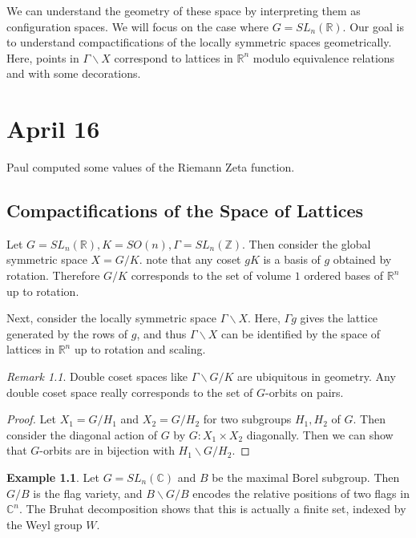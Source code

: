 \documentclass[leqno, openany]{memoir}
\theoremstyle{definition}
\newtheorem{exm}[thm]{Example}
\theoremstyle{remark}
\newtheorem{rmk}[thm]{Remark}
\theoremstyle{plain}
\theoremstyle{definition}
\theoremstyle{remark}
\newcommand{\R}{\mathbb{R}}
\newcommand{\C}{\mathbb{C}}
\newcommand{\Z}{\mathbb{Z}}
\begin{document}
We can understand the geometry of these space by interpreting them as
configuration spaces. We will focus on the case where $G = SL_n(\R)$. Our goal
is to understand compactifications of the locally symmetric spaces
geometrically. Here, points in $\Gamma \backslash X$ correspond to lattices in
$\R^n$ modulo equivalence relations and with some decorations.

\chapter{April 16}%

Paul computed some values of the Riemann Zeta function.

\section{Compactifications of the Space of Lattices}%
\label{sec:compactifications_of_the_space_of_lattices}

Let $G = SL_n(\R), K = SO(n), \Gamma = SL_n(\Z)$. Then consider the global
symmetric space $X = G/K$. note that any coset $gK$ is a basis of $g$ obtained
by rotation. Therefore $G/K$ corresponds to the set of volume $1$ ordered bases
of $\R^n$ up to rotation. 

Next, consider the locally symmetric space $\Gamma \backslash X$. Here, $\Gamma
g$ gives the lattice generated by the rows of $g$, and thus $\Gamma \backslash
X$ can be identified by the space of lattices in $\R^n$ up to rotation and
scaling.

\begin{rmk} Double coset spaces like $\Gamma \backslash G / K$ are ubiquitous
in geometry. Any double coset space really corresponds to the set of $G$-orbits
on pairs.  \end{rmk}

\begin{proof} Let $X_1 = G/H_1$ and $X_2 = G/H_2$ for two subgroups $H_1,H_2$
    of $G$. Then consider the diagonal action of $G$ by $G: X_1 \times X_2$
    diagonally. Then we can show that $G$-orbits are in bijection with $H_1
    \backslash G / H_2$.  \end{proof}

\begin{exm} Let $G = SL_n(\C)$ and $B$ be the maximal Borel subgroup. Then
    $G/B$ is the flag variety, and $B \backslash G / B$ encodes the relative
    positions of two flags in $\C^n$. The Bruhat decomposition shows that this
    is actually a finite set, indexed by the Weyl group $W$.  \end{exm}
\end{document}
